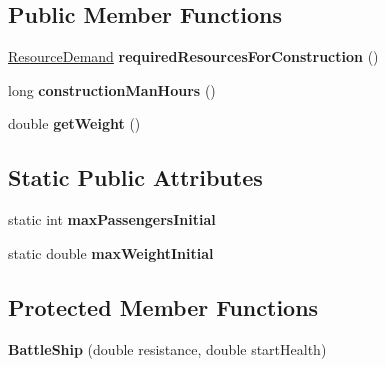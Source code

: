 \subsection*{Public Member Functions}
\begin{DoxyCompactItemize}
\item 
\hyperlink{classuniverse_1_1_resource_demand}{Resource\+Demand} {\bfseries required\+Resources\+For\+Construction} ()\hypertarget{classtools_1_1vehicles_1_1sea_1_1_battle_ship_a962fe23dc24f83a8fc922269b5a8efc9}{}\label{classtools_1_1vehicles_1_1sea_1_1_battle_ship_a962fe23dc24f83a8fc922269b5a8efc9}

\item 
long {\bfseries construction\+Man\+Hours} ()\hypertarget{classtools_1_1vehicles_1_1sea_1_1_battle_ship_ae5cb70c96915c2830ba98c2058d5b15d}{}\label{classtools_1_1vehicles_1_1sea_1_1_battle_ship_ae5cb70c96915c2830ba98c2058d5b15d}

\item 
double {\bfseries get\+Weight} ()\hypertarget{classtools_1_1vehicles_1_1sea_1_1_battle_ship_a3a405fafb4f7b4ea366b6e3479be4b81}{}\label{classtools_1_1vehicles_1_1sea_1_1_battle_ship_a3a405fafb4f7b4ea366b6e3479be4b81}

\end{DoxyCompactItemize}
\subsection*{Static Public Attributes}
\begin{DoxyCompactItemize}
\item 
static int {\bfseries max\+Passengers\+Initial}\hypertarget{classtools_1_1vehicles_1_1sea_1_1_battle_ship_a2008b98a3d5d7747ffa89101b9a6cb84}{}\label{classtools_1_1vehicles_1_1sea_1_1_battle_ship_a2008b98a3d5d7747ffa89101b9a6cb84}

\item 
static double {\bfseries max\+Weight\+Initial}\hypertarget{classtools_1_1vehicles_1_1sea_1_1_battle_ship_ab62fdbcd6d1ac9e7e0ff857cc9e40f1b}{}\label{classtools_1_1vehicles_1_1sea_1_1_battle_ship_ab62fdbcd6d1ac9e7e0ff857cc9e40f1b}

\end{DoxyCompactItemize}
\subsection*{Protected Member Functions}
\begin{DoxyCompactItemize}
\item 
{\bfseries Battle\+Ship} (double resistance, double start\+Health)\hypertarget{classtools_1_1vehicles_1_1sea_1_1_battle_ship_ae6e0716d5287f4e4e60e59c263ae9401}{}\label{classtools_1_1vehicles_1_1sea_1_1_battle_ship_ae6e0716d5287f4e4e60e59c263ae9401}

\end{DoxyCompactItemize}
